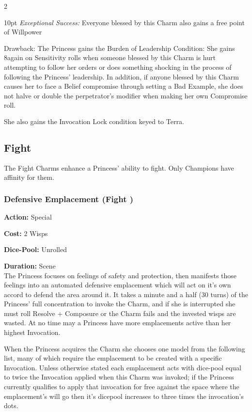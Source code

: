 \begin{multicols}{2}
\begin{myindentpar}{10pt}
    \emph{Exceptional Success:} Everyone blessed by this Charm also gains a free point of Willpower\end{myindentpar}

\noindent Drawback: The Princess gains the Burden of Leadership Condition: She gains 8again on Sensitivity rolls when someone blessed by this Charm is hurt attempting to follow her orders or does something shocking in the process of following the Princess' leadership. In addition, if anyone blessed by this Charm causes her to face a Belief compromise through setting a Bad Example, she does not halve or double the perpetrator's modifier when making her own Compromise roll.

She also gains the Invocation Lock condition keyed to Terra. 

\subsection*{Fight}
\label{subsec:Fight}
The Fight Charms enhance a Princess' ability to fight. Only Champions have affinity for them.

\subsubsection*{Defensive Emplacement (Fight \textbullet)}

\noindent \textbf{Action:} Special

\noindent \textbf{Cost:} 2 Wisps

\noindent \textbf{Dice-Pool:} Unrolled

\noindent \textbf{Duration:} Scene\\

The Princess focuses on feelings of safety and protection, then manifests those feelings into an automated defensive emplacement which will act on it's own accord to defend the area around it. It takes a minute and a half (30 turns) of the Princess' full concentration to invoke the Charm, and if she is interrupted she must roll Resolve + Composure or the Charm fails and the invested wisps are wasted. At no time may a Princess have more emplacements active than her highest Invocation.

When the Princess acquires the Charm she chooses one model from the following list, many of which require the emplacement to be created with a specific Invocation. Unless otherwise stated each emplacement acts with dice-pool equal to twice the Invocation applied when this Charm was invoked; if the Princess currently qualifies to apply that invocation for free against the space where the emplacement's will go then it's dicepool increases to three times the invocation's dots. 


\end{multicols}
